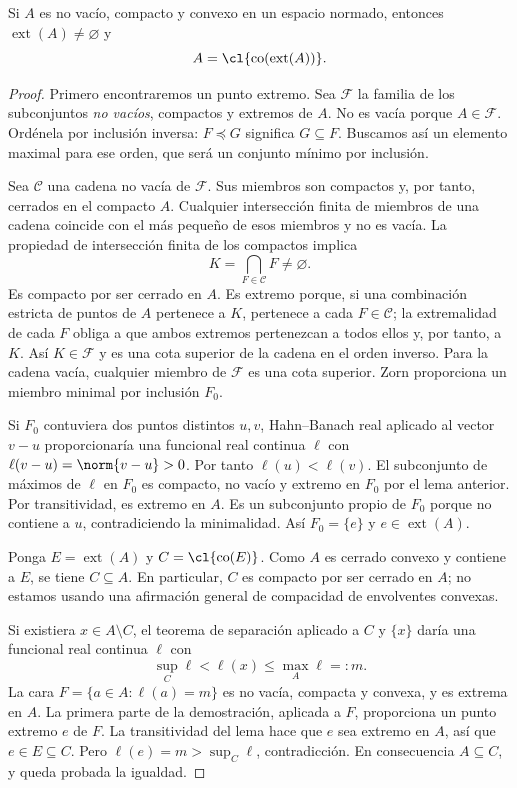 \begin{teorema}\label{ch24:krein-milman}
Si $A$ es no vacío, compacto y convexo en un espacio normado, entonces $\operatorname{ext}(A)\ne\varnothing$ y
\[
 A=\cl{\operatorname{co}(\operatorname{ext}(A))}.
\]
\end{teorema}
\begin{proof}
Primero encontraremos un punto extremo. Sea $\mathcal F$ la familia de los subconjuntos \emph{no vacíos}, compactos y extremos de $A$. No es vacía porque $A\in\mathcal F$. Ordénela por inclusión inversa: $F\preceq G$ significa $G\subseteq F$. Buscamos así un elemento maximal para ese orden, que será un conjunto mínimo por inclusión.

Sea $\mathcal C$ una cadena no vacía de $\mathcal F$. Sus miembros son compactos y, por tanto, cerrados en el compacto $A$. Cualquier intersección finita de miembros de una cadena coincide con el más pequeño de esos miembros y no es vacía. La propiedad de intersección finita de los compactos implica
\[
 K=\bigcap_{F\in\mathcal C}F\ne\varnothing.
\]
Es compacto por ser cerrado en $A$. Es extremo porque, si una combinación estricta de puntos de $A$ pertenece a $K$, pertenece a cada $F\in\mathcal C$; la extremalidad de cada $F$ obliga a que ambos extremos pertenezcan a todos ellos y, por tanto, a $K$. Así $K\in\mathcal F$ y es una cota superior de la cadena en el orden inverso. Para la cadena vacía, cualquier miembro de $\mathcal F$ es una cota superior. Zorn proporciona un miembro minimal por inclusión $F_0$.

Si $F_0$ contuviera dos puntos distintos $u,v$, Hahn--Banach real aplicado al vector $v-u$ proporcionaría una funcional real continua $\ell$ con $\ell(v-u)=\norm{v-u}>0$. Por tanto $\ell(u)<\ell(v)$. El subconjunto de máximos de $\ell$ en $F_0$ es compacto, no vacío y extremo en $F_0$ por el lema anterior. Por transitividad, es extremo en $A$. Es un subconjunto propio de $F_0$ porque no contiene a $u$, contradiciendo la minimalidad. Así $F_0=\{e\}$ y $e\in\operatorname{ext}(A)$.

Ponga $E=\operatorname{ext}(A)$ y $C=\cl{\operatorname{co}(E)}$. Como $A$ es cerrado convexo y contiene a $E$, se tiene $C\subseteq A$. En particular, $C$ es compacto por ser cerrado en $A$; no estamos usando una afirmación general de compacidad de envolventes convexas.

Si existiera $x\in A\setminus C$, el teorema de separación aplicado a $C$ y $\{x\}$ daría una funcional real continua $\ell$ con
\[
 \sup_C\ell<\ell(x)\leq\max_A\ell=:m.
\]
La cara $F=\{a\in A:\ell(a)=m\}$ es no vacía, compacta y convexa, y es extrema en $A$. La primera parte de la demostración, aplicada a $F$, proporciona un punto extremo $e$ de $F$. La transitividad del lema hace que $e$ sea extremo en $A$, así que $e\in E\subseteq C$. Pero $\ell(e)=m>\sup_C\ell$, contradicción. En consecuencia $A\subseteq C$, y queda probada la igualdad.
\end{proof}

